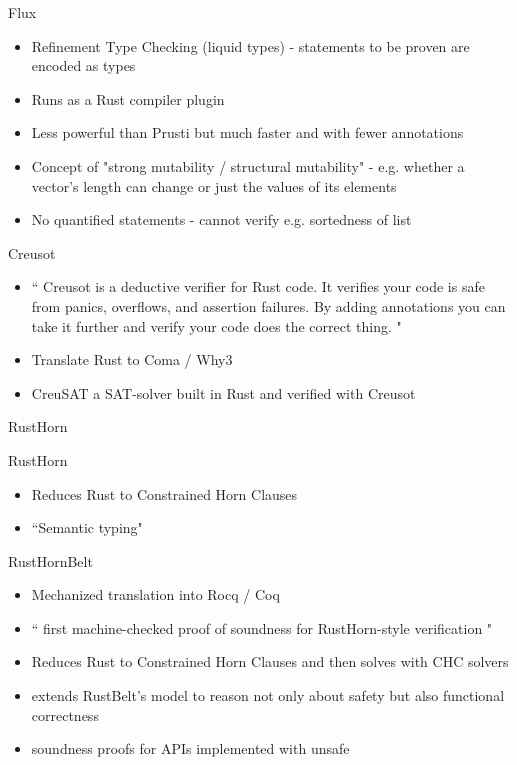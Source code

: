 \documentclass{beamer}
\begin{document}
\begin{frame}{Flux} 
\begin{itemize}
\item Refinement Type Checking (liquid types) - statements to be proven are encoded as types
\item Runs as a Rust compiler plugin 
\item Less powerful than Prusti but much faster and with fewer annotations
\item Concept of "strong mutability / structural mutability" - e.g. whether a vector's length can change or just the values of its elements
\item No quantified statements - cannot verify e.g. sortedness of list
\end{itemize}
\end{frame}

\begin{frame}{Creusot} 
\begin{itemize}
\item ``
Creusot is a deductive verifier for Rust code. It verifies your code is safe from panics, overflows, and assertion failures. By adding annotations you can take it further and verify your code does the correct thing.
"
\item Translate Rust to Coma / Why3
\item CreuSAT a SAT-solver built in Rust and verified with Creusot
\end{itemize}
\end{frame}

\begin{frame}{RustHorn} 
\begin{block}{RustHorn}
\begin{itemize}
\item Reduces Rust to Constrained Horn Clauses
\item ``Semantic typing"
\end{itemize}
\end{block}
\begin{block}{RustHornBelt}
\begin{itemize}
\item Mechanized translation into Rocq / Coq
\item ``
first machine-checked proof of soundness for RustHorn-style verification
"
\item Reduces Rust to Constrained Horn Clauses and then solves with CHC solvers
\item extends RustBelt’s model to reason not only about safety but also functional correctness
\item soundness proofs for APIs implemented with unsafe
\end{itemize}
\end{block}

\end{frame}
\end{document}
